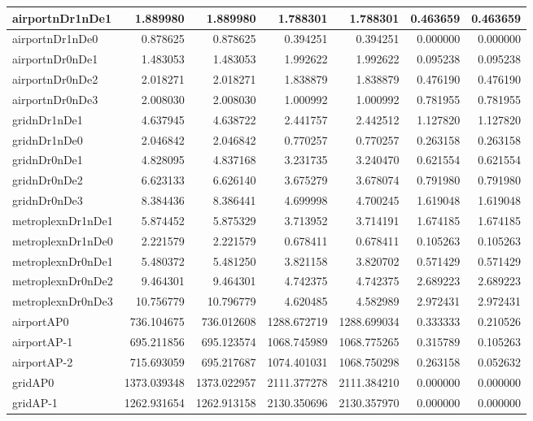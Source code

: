 \begin{longtable}{|l|r|r|r|r|r|r|}
\endlastfoot
airportnDr1nDe1 & 1.889980 & 1.889980 & 1.788301 & 1.788301 & 0.463659 & 0.463659 \\ \hline
airportnDr1nDe0 & 0.878625 & 0.878625 & 0.394251 & 0.394251 & 0.000000 & 0.000000 \\ \hline
airportnDr0nDe1 & 1.483053 & 1.483053 & 1.992622 & 1.992622 & 0.095238 & 0.095238 \\ \hline
airportnDr0nDe2 & 2.018271 & 2.018271 & 1.838879 & 1.838879 & 0.476190 & 0.476190 \\ \hline
airportnDr0nDe3 & 2.008030 & 2.008030 & 1.000992 & 1.000992 & 0.781955 & 0.781955 \\ \hline
gridnDr1nDe1 & 4.637945 & 4.638722 & 2.441757 & 2.442512 & 1.127820 & 1.127820 \\ \hline
gridnDr1nDe0 & 2.046842 & 2.046842 & 0.770257 & 0.770257 & 0.263158 & 0.263158 \\ \hline
gridnDr0nDe1 & 4.828095 & 4.837168 & 3.231735 & 3.240470 & 0.621554 & 0.621554 \\ \hline
gridnDr0nDe2 & 6.623133 & 6.626140 & 3.675279 & 3.678074 & 0.791980 & 0.791980 \\ \hline
gridnDr0nDe3 & 8.384436 & 8.386441 & 4.699998 & 4.700245 & 1.619048 & 1.619048 \\ \hline
metroplexnDr1nDe1 & 5.874452 & 5.875329 & 3.713952 & 3.714191 & 1.674185 & 1.674185 \\ \hline
metroplexnDr1nDe0 & 2.221579 & 2.221579 & 0.678411 & 0.678411 & 0.105263 & 0.105263 \\ \hline
metroplexnDr0nDe1 & 5.480372 & 5.481250 & 3.821158 & 3.820702 & 0.571429 & 0.571429 \\ \hline
metroplexnDr0nDe2 & 9.464301 & 9.464301 & 4.742375 & 4.742375 & 2.689223 & 2.689223 \\ \hline
metroplexnDr0nDe3 & 10.756779 & 10.796779 & 4.620485 & 4.582989 & 2.972431 & 2.972431 \\ \hline
airportAP0 & 736.104675 & 736.012608 & 1288.672719 & 1288.699034 & 0.333333 & 0.210526 \\ \hline
airportAP-1 & 695.211856 & 695.123574 & 1068.745989 & 1068.775265 & 0.315789 & 0.105263 \\ \hline
airportAP-2 & 715.693059 & 695.217687 & 1074.401031 & 1068.750298 & 0.263158 & 0.052632 \\ \hline
gridAP0 & 1373.039348 & 1373.022957 & 2111.377278 & 2111.384210 & 0.000000 & 0.000000 \\ \hline
gridAP-1 & 1262.931654 & 1262.913158 & 2130.350696 & 2130.357970 & 0.000000 & 0.000000 \\ \hline

\end{longtable}
